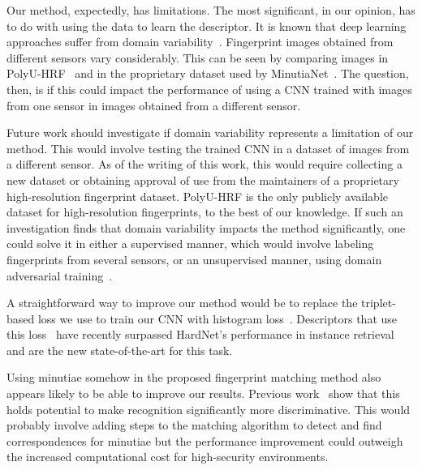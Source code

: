 \documentclass[10pt,twocolumn,letterpaper]{article}
\begin{document}

Our method, expectedly, has limitations.
The most significant, in our opinion, has to do with using the data to learn the descriptor.
It is known that deep learning approaches suffer from domain variability~\cite{domain-gan}.
Fingerprint images obtained from different sensors vary considerably.
This can be seen by comparing images in PolyU-HRF~\cite{direct-pore} and in the proprietary dataset used by MinutiaNet~\cite{zhang-pattern-rec}.
The question, then, is if this could impact the performance of using a CNN trained with images from one sensor in images obtained from a different sensor.

Future work should investigate if domain variability represents a limitation of our method.
This would involve testing the trained CNN in a dataset of images from a different sensor.
As of the writing of this work, this would require collecting a new dataset or obtaining approval of use from the maintainers of a proprietary high-resolution fingerprint dataset.
PolyU-HRF is the only publicly available dataset for high-resolution fingerprints, to the best of our knowledge.
If such an investigation finds that domain variability impacts the method significantly, one could solve it in either a supervised manner, which would involve labeling fingerprints from several sensors, or an unsupervised manner, \eg using domain adversarial training~\cite{domain-gan}.

A straightforward way to improve our method would be to replace the triplet-based loss we use to train our CNN with histogram loss~\cite{histogram-loss}.
Descriptors that use this loss~\cite{doap} have recently surpassed HardNet's performance in instance retrieval and are the new state-of-the-art for this task.

Using minutiae somehow in the proposed fingerprint matching method also appears likely to be able to improve our results.
Previous work~\cite{feature-guided, td-sparse} show that this holds potential to make recognition significantly more discriminative.
This would probably involve adding steps to the matching algorithm to detect and find correspondences for minutiae but the performance improvement could outweigh the increased computational cost for high-security environments.
\end{document}
